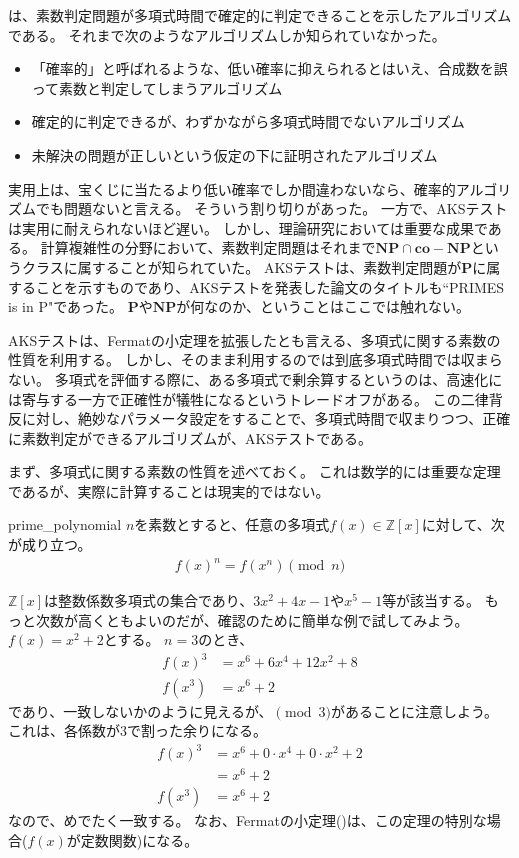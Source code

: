 は、素数判定問題が多項式時間で確定的に判定できることを示したアルゴリズムである。
それまで次のようなアルゴリズムしか知られていなかった。
\begin{itemize}
\item 「確率的」と呼ばれるような、低い確率に抑えられるとはいえ、合成数を誤って素数と判定してしまうアルゴリズム
\item 確定的に判定できるが、わずかながら多項式時間でないアルゴリズム
\item 未解決の問題が正しいという仮定の下に証明されたアルゴリズム
\end{itemize}

実用上は、宝くじに当たるより低い確率でしか間違わないなら、確率的アルゴリズムでも問題ないと言える。
そういう割り切りがあった。
一方で、AKSテストは実用に耐えられないほど遅い。
しかし、理論研究においては重要な成果である。
計算複雑性の分野において、素数判定問題はそれまで$\mathbf{NP}\cap\mathbf{co-NP}$というクラスに属することが知られていた。
AKSテストは、素数判定問題が$\mathbf{P}$に属することを示すものであり、AKSテストを発表した論文のタイトルも``PRIMES is in P"であった\cite{Agrawal02primesis}。
$\mathbf{P}$や$\mathbf{NP}$が何なのか、ということはここでは触れない。

AKSテストは、Fermatの小定理を拡張したとも言える、多項式に関する素数の性質を利用する。
しかし、そのまま利用するのでは到底多項式時間では収まらない。
多項式を評価する際に、ある多項式で剰余算するというのは、高速化には寄与する一方で正確性が犠牲になるというトレードオフがある。
この二律背反に対し、絶妙なパラメータ設定をすることで、多項式時間で収まりつつ、正確に素数判定ができるアルゴリズムが、AKSテストである。

まず、多項式に関する素数の性質を述べておく。
これは数学的には重要な定理であるが、実際に計算することは現実的ではない。

\begin{Theo}{}{prime_polynomial}
$n$を素数とすると、任意の多項式$f(x)\in\mathbb{Z}[x]$に対して、次が成り立つ。
\begin{align*}
f(x)^n = f(x^n) \pmod{n}
\end{align*}
\end{Theo}

$\mathbb{Z}[x]$は整数係数多項式の集合であり、$3x^2+4x-1$や$x^5-1$等が該当する。
もっと次数が高くともよいのだが、確認のために簡単な例で試してみよう。
$f(x) = x^2 + 2$とする。
$n=3$のとき、
\begin{align*}
f(x)^3 &= x^6 + 6x^4 + 12x^2 + 8\\
f(x^3) &= x^6 + 2
\end{align*}
であり、一致しないかのように見えるが、$\pmod{3}$があることに注意しよう。
これは、各係数が3で割った余りになる。
\begin{align*}
f(x)^3 &= x^6 + 0 \cdot x^4 + 0\cdot x^2 + 2\\
&= x^6 + 2\\
f(x^3) &= x^6 + 2
\end{align*}
なので、めでたく一致する。
なお、Fermatの小定理()は、この定理の特別な場合($f(x)$が定数関数)になる。


